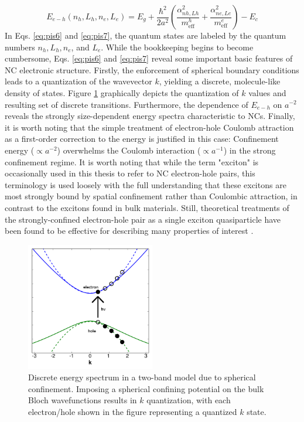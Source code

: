 \begin{equation}\label{eq:pis7}
E_{e-h} \left(n_h, L_h, n_e, L_e\right) = E_g + \frac{\hbar^2}{2a^2}\left(\frac{\alpha_{nh, Lh}^2}{m_{\mathrm{eff}}^h} + \frac{\alpha_{ne, Le}^2}{m_{\mathrm{eff}}^e}\right) - E_c
\end{equation}
In Eqs. \ref{eq:pis6} and \ref{eq:pis7}, the quantum states are labeled by the quantum numbers $n_h, L_h, n_e$, and $L_e$. While the bookkeeping begins to become cumbersome, Eqs. \ref{eq:pis6} and \ref{eq:pis7} reveal some important basic features of NC electronic structure. Firstly, the enforcement of spherical boundary conditions leads to a quantization of the wavevector $k$, yielding a discrete, molecule-like density of states. Figure \ref{f:pis2} graphically depicts the quantization of $k$ values and resulting set of discrete transitions. Furthermore, the dependence of $E_{e-h}$ on $a^{-2}$ reveals the strongly size-dependent energy spectra characteristic to NCs. Finally, it is worth noting that the simple treatment of electron-hole Coulomb attraction as a first-order correction to the energy is justified in this case: Confinement energy ($\propto a^{-2}$) overwhelms the Coulomb interaction ($\propto a^{-1}$) in the strong confinement regime. It is worth noting that while the term "exciton" is occasionally used in this thesis to refer to NC electron-hole pairs, this terminology is used loosely with the full understanding that these excitons are most strongly bound by spatial confinement rather than Coulombic attraction, in contrast to the excitons found in bulk materials. Still, theoretical treatments of the strongly-confined electron-hole pair as a single exciton quasiparticle have been found to be effective for describing many properties of interest \cite{scholes2006excitons}. \par

\begin{figure}
\begin{center}
\includegraphics[width=0.5\textwidth]{./Chapter1/parabolic_quantized.png}
\caption[Discrete energy spectrum in a two-band model due to spherical confinement.]{Discrete energy spectrum in a two-band model due to spherical confinement. Imposing a spherical confining potential on the bulk Bloch wavefunctions results in $k$ quantization, with each electron/hole shown in the figure representing a quantized $k$ state.}
\label{f:pis2}
\end{center}
\end{figure}

